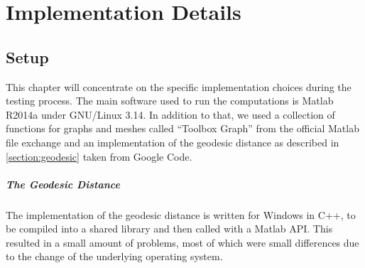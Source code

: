 \chapter{Implementation Details}
\label{chapter:implementation}

\section{Setup}
This chapter will concentrate on the specific implementation choices during the testing process.
The main software used to run the computations is Matlab R2014a under GNU/Linux 3.14.
In addition to that, we used a collection of functions for graphs and meshes called ``Toolbox Graph'' from the official Matlab file exchange\cite{online_toolbox} and an implementation of the geodesic distance as described in \ref{section:geodesic} taken from Google Code\cite{online_geodesic}.

\paragraph{The Geodesic Distance}
The implementation of the geodesic distance is written for Windows in C++, to be compiled into a shared library and then called with a Matlab API.
This resulted in a small amount of problems, most of which were small differences due to the change of the underlying operating system.
